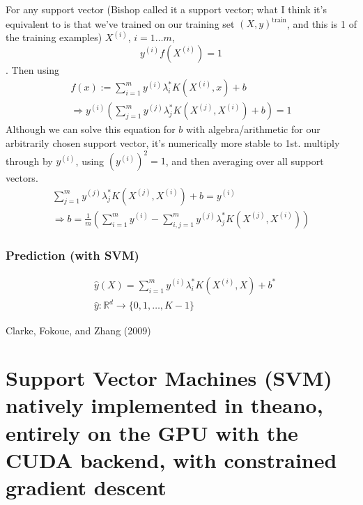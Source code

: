 \documentclass[10pt]{amsart}
\begin{document}
\begin{multicols*}{2}
For any support vector (Bishop called it a support vector; what I think it's equivalent to is that we've trained on our training set $(X,y)^{\text{train}}$, and this is 1 of the training examples) $X^{(i)}$, $i=1\dots m$,
\begin{equation}
  y^{(i)}f(X^{(i)}) =1
  \end{equation}.  Then using
\begin{equation}
\begin{gathered}
  f(x):=\sum_{i=1}^m y^{(i)} \lambda_i^* K(X^{(i)},x) + b \\
  \Longrightarrow y^{(i)} \left( \sum_{j=1}^m y^{(j)} \lambda_j^* K(X^{(j)},X^{(i)} ) + b \right) = 1
  \end{gathered}
  \end{equation}
Although we can solve this equation for $b$ with algebra/arithmetic for our arbitrarily chosen support vector, it's numerically more stable to 1st. multiply through by $y^{(i)}$, using $(y^{(i)})^2 =1$, and then averaging over all support vectors.
\begin{equation}
  \begin{gathered}
    \sum_{j=1}^m y^{(j)}\lambda_j^* K(X^{(j)},X^{(i)}) +b = y^{(i)} \\
    \Longrightarrow b= \frac{1}{m} \left( \sum_{i=1}^m y^{(i)} - \sum_{i,j=1}^m y^{(j)} \lambda_j^* K(X^{(j)}, X^{(i)}) \right)
    \end{gathered}
  \end{equation}

\subsubsection{Prediction (with SVM)}

\begin{equation}
  \begin{aligned}
    & \widehat{y}(X) = \sum_{i=1}^m y^{(i)} \lambda_i^* K(X^{(i)}, X) + b^* \\ 
    & \widehat{y}:\mathbb{R}^d \to \lbrace 0 ,1 , \dots , K-1 \rbrace
    \end{aligned}
  \end{equation}


Clarke, Fokoue, and Zhang (2009) \cite{CFZ2009}



\section{Support Vector Machines (SVM) natively implemented in theano, entirely on the GPU with the CUDA backend, with constrained gradient descent}


\end{multicols*}
\end{document}
